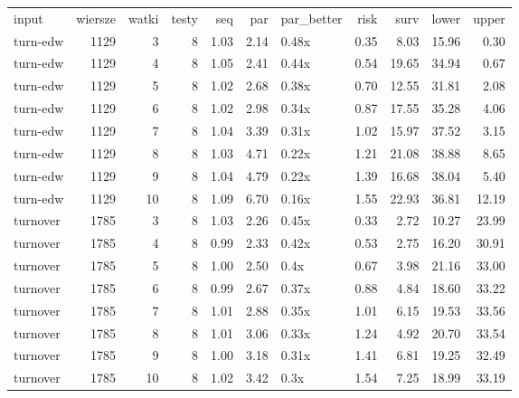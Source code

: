 \begin{table}[ht]
\centering
\begin{tabular}{lrrrrrlrrrr}
 input & wiersze & watki & testy & seq & par & par\_better & risk & surv & lower & upper \\ 
 turn-edw & 1129 &   3 &   8 & 1.03 & 2.14 & 0.48x & 0.35 & 8.03 & 15.96 & 0.30 \\ 
   \hline
turn-edw & 1129 &   4 &   8 & 1.05 & 2.41 & 0.44x & 0.54 & 19.65 & 34.94 & 0.67 \\ 
   \hline
turn-edw & 1129 &   5 &   8 & 1.02 & 2.68 & 0.38x & 0.70 & 12.55 & 31.81 & 2.08 \\ 
   \hline
turn-edw & 1129 &   6 &   8 & 1.02 & 2.98 & 0.34x & 0.87 & 17.55 & 35.28 & 4.06 \\ 
   \hline
turn-edw & 1129 &   7 &   8 & 1.04 & 3.39 & 0.31x & 1.02 & 15.97 & 37.52 & 3.15 \\ 
   \hline
turn-edw & 1129 &   8 &   8 & 1.03 & 4.71 & 0.22x & 1.21 & 21.08 & 38.88 & 8.65 \\ 
   \hline
turn-edw & 1129 &   9 &   8 & 1.04 & 4.79 & 0.22x & 1.39 & 16.68 & 38.04 & 5.40 \\ 
   \hline
turn-edw & 1129 &  10 &   8 & 1.09 & 6.70 & 0.16x & 1.55 & 22.93 & 36.81 & 12.19 \\ 
   \hline
turnover & 1785 &   3 &   8 & 1.03 & 2.26 & 0.45x & 0.33 & 2.72 & 10.27 & 23.99 \\ 
   \hline
turnover & 1785 &   4 &   8 & 0.99 & 2.33 & 0.42x & 0.53 & 2.75 & 16.20 & 30.91 \\ 
   \hline
turnover & 1785 &   5 &   8 & 1.00 & 2.50 & 0.4x & 0.67 & 3.98 & 21.16 & 33.00 \\ 
   \hline
turnover & 1785 &   6 &   8 & 0.99 & 2.67 & 0.37x & 0.88 & 4.84 & 18.60 & 33.22 \\ 
   \hline
turnover & 1785 &   7 &   8 & 1.01 & 2.88 & 0.35x & 1.01 & 6.15 & 19.53 & 33.56 \\ 
   \hline
turnover & 1785 &   8 &   8 & 1.01 & 3.06 & 0.33x & 1.24 & 4.92 & 20.70 & 33.54 \\ 
   \hline
turnover & 1785 &   9 &   8 & 1.00 & 3.18 & 0.31x & 1.41 & 6.81 & 19.25 & 32.49 \\ 
   \hline
turnover & 1785 &  10 &   8 & 1.02 & 3.42 & 0.3x & 1.54 & 7.25 & 18.99 & 33.19 \\ 
   \hline
\end{tabular}
\end{table}
